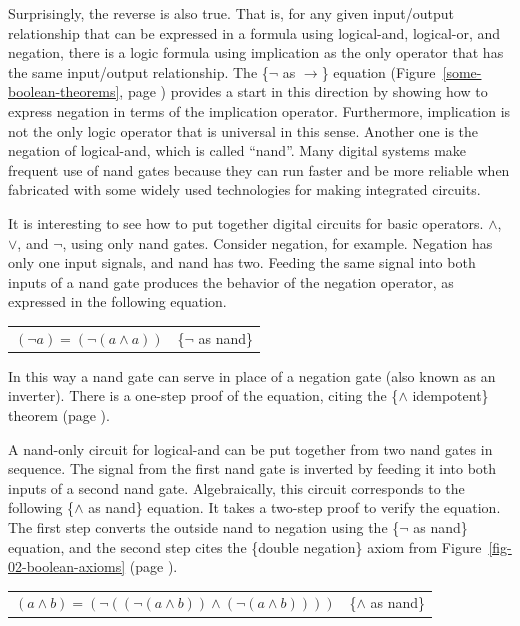 Surprisingly, the reverse is also true.
That is, for any given input/output relationship that can be expressed
in a formula using logical-and, logical-or, and negation,
there is a logic formula using implication as
the only operator that has the same input/output relationship.
The \{$\neg$ as $\rightarrow$\} equation
(Figure~\ref{some-boolean-theorems}, page \pageref{some-boolean-theorems})
provides a start in this direction by showing how to express
negation in terms of the implication operator.
Furthermore, implication is not the only logic operator
that is universal in this sense.
Another one
is the negation of logical-and, which is called ``nand''.
Many digital systems make frequent use of
nand gates because they can run faster and be more reliable
when fabricated with some widely used technologies 
for making integrated circuits.

It is interesting to see how to put together digital
circuits for basic operators.
$\wedge$, $\vee$, and $\neg$, using only nand gates.
Consider negation, for example.
Negation has only one input signals, and nand has two.
Feeding the same signal into both
inputs of a nand gate produces the behavior of
the negation operator,
as expressed in the following equation.

\begin{center}
\begin{tabular}{ll}
$(\neg a) = (\neg (a \wedge a))$  & \{$\neg$ as nand\}\label{neg-as-nand}
\end{tabular}
\end{center}

In this way a nand gate can serve in place of a
negation gate (also known as an inverter).
There is a one-step proof of the equation,
citing the \{$\wedge$ idempotent\} theorem
(page \pageref{and-idempotent}).

A nand-only circuit for logical-and can be
put together from two nand gates in sequence.
The signal from the first nand gate is inverted
by feeding it into both inputs of a second nand gate.
Algebraically, this circuit corresponds to the following \{$\wedge$ as nand\} equation.
It takes a two-step proof to verify the equation.
The first step converts the outside nand to negation using the
\{$\neg$ as nand\} equation, and the second step cites
the \{double negation\} axiom from Figure~\ref{fig-02-boolean-axioms}
(page \pageref{fig-02-boolean-axioms}).

\begin{center}
\begin{tabular}{ll}
$(a \wedge b) = (\neg ((\neg (a \wedge b)) \wedge (\neg (a \wedge b))))$ & \{$\wedge$ as nand\}\label{and-as-nand}
\end{tabular}
\end{center}

